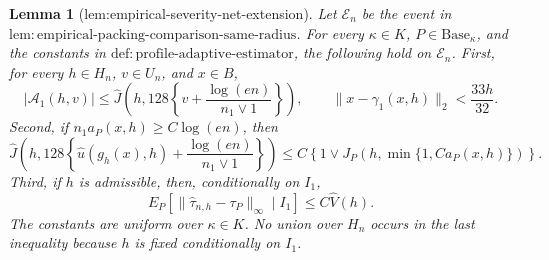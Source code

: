 \documentclass{article}
\newtheorem{lemma}{Lemma}
\begin{document}
\begin{lemma}[lem:empirical-severity-net-extension]\label{lem:empirical-severity-net-extension}
Let \(\mathcal E_n\) be the event in
\(\mathrm{lem{:}empirical\text{-}packing\text{-}comparison\text{-}same\text{-}radius}\).
For every \(\kappa\in K\), \(P\in\mathrm{Base}_\kappa\), and the constants in \(\mathrm{def{:}profile\text{-}adaptive\text{-}estimator}\), the following hold on \(\mathcal E_n\).  First, for every \(h\in H_n\), \(v\in U_n\), and \(x\in B\),
\[
 |\mathcal A_1(h,v)|
 \leq
 \widehat J\!\left(h,128\left\{v+\frac{\log(en)}{n_1\vee1}\right\}\right),
 \qquad
 \|x-\gamma_1(x,h)\|_2<\frac{33h}{32}.
\]
Second, if \(n_1a_P(x,h)\geq C\log(en)\), then
\[
 \widehat J\!\left(
 h,128\left\{\widehat u(g_h(x),h)+
 \frac{\log(en)}{n_1\vee1}\right\}\right)
 \leq C\left\{1\vee
 J_P\!\left(h,\min\{1,Ca_P(x,h)\}\right)\right\}.
\]
Third, if \(h\) is admissible, then, conditionally on \(I_1\),
\[
 E_P\!\left[
 \|\widehat\tau_{n,h}-\tau_P\|_\infty\mid I_1\right]
 \leq C\widehat V(h).
\]
The constants are uniform over \(\kappa\in K\).  No union over \(H_n\) occurs in the last inequality because \(h\) is fixed conditionally on \(I_1\).
\end{lemma}
\end{document}
